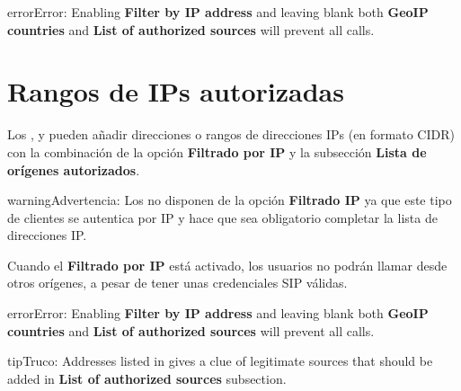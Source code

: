 \documentclass[letterpaper,10pt,spanish]{sphinxmanual}
\begin{document}
\begin{notice}{error}{Error:}
Enabling \textbf{Filter by IP address} and leaving blank both \textbf{GeoIP countries} and \textbf{List of authorized sources}
will prevent all calls.
\end{notice}


\section{Rangos de IPs autorizadas}
\label{security_and_maintenance/security/authorized_ip_ranges:client-authorized-ip-ranges}\label{security_and_maintenance/security/authorized_ip_ranges::doc}\label{security_and_maintenance/security/authorized_ip_ranges:authorized-ip-ranges}
Los {\hyperref[administration_portal/client/vpbx/index:vpbx\string-clients]{}}, {\hyperref[administration_portal/client/retail/index:retail\string-clients]{}} y {\hyperref[administration_portal/client/residential/index:residential\string-clients]{}} pueden añadir direcciones o rangos de direcciones IPs  (en formato CIDR) con la combinación de la opción \textbf{Filtrado por IP} y la subsección \textbf{Lista de orígenes autorizados}.

\begin{notice}{warning}{Advertencia:}
Los {\hyperref[administration_portal/client/wholesale/index:wholesale\string-clients]{}} no disponen de la opción \textbf{Filtrado IP} ya que este tipo de clientes se autentica por IP y hace que sea obligatorio completar la lista de direcciones IP.
\end{notice}

Cuando el \textbf{Filtrado por IP} está activado, los usuarios no podrán llamar desde otros orígenes, a pesar de tener unas credenciales SIP válidas.

\begin{notice}{error}{Error:}
Enabling \textbf{Filter by IP address} and leaving blank both \textbf{GeoIP countries} and \textbf{List of authorized sources}
will prevent all calls.
\end{notice}

\begin{notice}{tip}{Truco:}
Addresses listed in {\hyperref[administration_portal/brand/views/ipfilter_blocked_addresses:ip\string-filter\string-blocked\string-addresses]{}} gives a clue of legitimate sources that should be
added in \textbf{List of authorized sources} subsection.
\end{notice}
\end{document}
